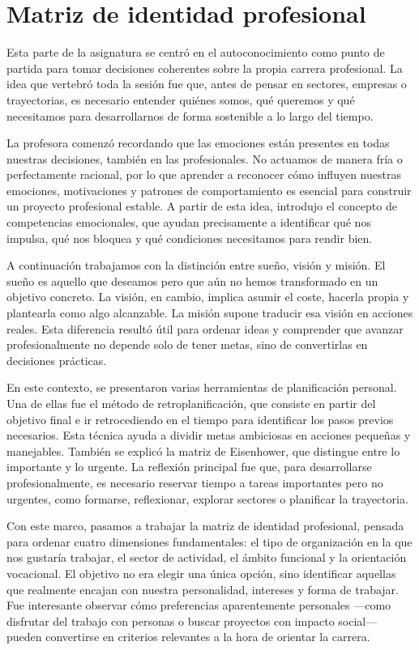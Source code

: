 \chapter{Matriz de identidad profesional}

Esta parte de la asignatura se centró en el autoconocimiento como punto de partida para tomar decisiones coherentes sobre la propia carrera profesional. La idea que vertebró toda la sesión fue que, antes de pensar en sectores, empresas o trayectorias, es necesario entender quiénes somos, qué queremos y qué necesitamos para desarrollarnos de forma sostenible a lo largo del tiempo.

La profesora comenzó recordando que las emociones están presentes en todas nuestras decisiones, también en las profesionales. No actuamos de manera fría o perfectamente racional, por lo que aprender a reconocer cómo influyen nuestras emociones, motivaciones y patrones de comportamiento es esencial para construir un proyecto profesional estable. A partir de esta idea, introdujo el concepto de competencias emocionales, que ayudan precisamente a identificar qué nos impulsa, qué nos bloquea y qué condiciones necesitamos para rendir bien.

A continuación trabajamos con la distinción entre sueño, visión y misión. El sueño es aquello que deseamos pero que aún no hemos transformado en un objetivo concreto. La visión, en cambio, implica asumir el coste, hacerla propia y plantearla como algo alcanzable. La misión supone traducir esa visión en acciones reales. Esta diferencia resultó útil para ordenar ideas y comprender que avanzar profesionalmente no depende solo de tener metas, sino de convertirlas en decisiones prácticas.

En este contexto, se presentaron varias herramientas de planificación personal. Una de ellas fue el método de retroplanificación, que consiste en partir del objetivo final e ir retrocediendo en el tiempo para identificar los pasos previos necesarios. Esta técnica ayuda a dividir metas ambiciosas en acciones pequeñas y manejables. También se explicó la matriz de Eisenhower, que distingue entre lo importante y lo urgente. La reflexión principal fue que, para desarrollarse profesionalmente, es necesario reservar tiempo a tareas importantes pero no urgentes, como formarse, reflexionar, explorar sectores o planificar la trayectoria.

Con este marco, pasamos a trabajar la matriz de identidad profesional, pensada para ordenar cuatro dimensiones fundamentales: el tipo de organización en la que nos gustaría trabajar, el sector de actividad, el ámbito funcional y la orientación vocacional. El objetivo no era elegir una única opción, sino identificar aquellas que realmente encajan con nuestra personalidad, intereses y forma de trabajar. Fue interesante observar cómo preferencias aparentemente personales —como disfrutar del trabajo con personas o buscar proyectos con impacto social— pueden convertirse en criterios relevantes a la hora de orientar la carrera.

